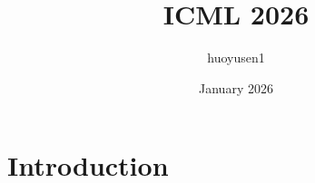 \documentclass{article}
\title{ICML 2026}
\author{huoyusen1 }
\date{January 2026}
\begin{document}
\maketitle

\section{Introduction}
\end{document}
